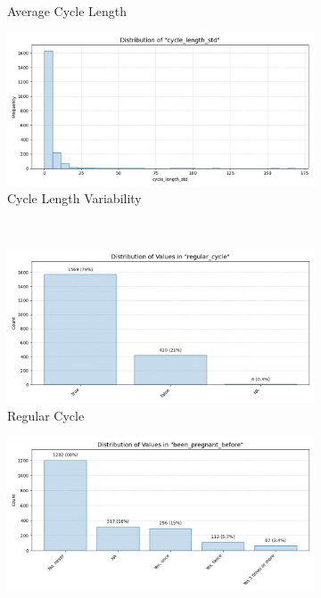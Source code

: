 \documentclass[11pt]{article}
\begin{document}
\begin{figure}[h]
\begin{subfigure}{0.45\textwidth}
    \caption{Average Cycle Length}
    \label{fig:dist_avg_cycle}
  \end{subfigure}
  \hfill
  \begin{subfigure}{0.45\textwidth}
    \includegraphics[width=\linewidth]{plots/cycle_length_std.jpg}
    \caption{Cycle Length Variability}
    \label{fig:dist_cycle_std}
  \end{subfigure}
  \\
  \vspace{0.5em}
  \begin{subfigure}{0.45\textwidth}
    \includegraphics[width=\linewidth]{plots/regular_cycle.jpg}
    \caption{Regular Cycle}
    \label{fig:dist_regular_cycle}
  \end{subfigure}
  \hfill
  \begin{subfigure}{0.45\textwidth}
    \includegraphics[width=\linewidth]{plots/been_pregnant_before.jpg}

\end{subfigure}
\end{figure}
\end{document}
